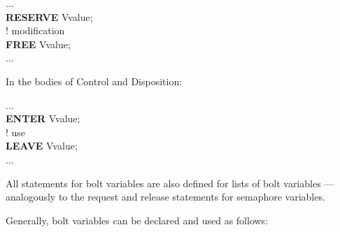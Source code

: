 ...\\
{\bf RESERVE} Vvalue;\\
\x ! modification\\
{\bf FREE} Vvalue;\\
...

In the bodies of Control and Disposition:

...\\
{\bf ENTER} Vvalue;\\
\x ! use\\
{\bf LEAVE} Vvalue;\\
...

All statements for bolt variables are also defined for lists of bolt
variables --- analogously to the request and release statements for
semaphore variables.

Generally, bolt variables can be declared and used as follows:






